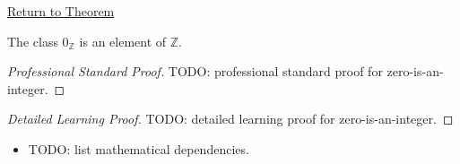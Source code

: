 \newpage
{}
\label{prf:zero-is-an-integer}

\begin{remark*}[Return]
\hyperref[thm:zero-is-an-integer]{Return to Theorem}
\end{remark*}

\begin{theorem*}
The class $0_{\mathbb{Z}}$ is an element of $\mathbb{Z}$.
\end{theorem*}

\begin{proof}[Professional Standard Proof]
\LRAProofBodyStart
TODO: professional standard proof for zero-is-an-integer.
\end{proof}

\begin{proof}[Detailed Learning Proof]
\LRAProofBodyStart
TODO: detailed learning proof for zero-is-an-integer.
\end{proof}

\begin{remark*}
\end{remark*}

\begin{dependencies}
\begin{itemize}
  \item TODO: list mathematical dependencies.
\end{itemize}
\end{dependencies}

\clearpage
